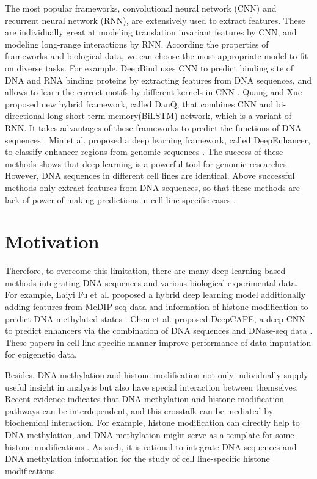The most popular frameworks, convolutional neural network (CNN) and recurrent neural network (RNN), are extensively used to extract features. These are individually great at modeling translation invariant features by CNN, and modeling long-range interactions by RNN. According the properties of frameworks and biological data, we can choose the most appropriate model to fit on diverse tasks. For example, DeepBind uses CNN to predict binding site of DNA and RNA binding proteins by extracting features from DNA sequences, and allows to learn the correct motifs by different kernels in CNN \cite{alipanahi2015predicting}. Quang and Xue proposed new hybrid framework, called DanQ, that combines CNN and bi-directional long-short term memory(BiLSTM) network, which is a variant of RNN. It takes advantages of these frameworks to predict the functions of DNA sequences \cite{quang2016danq}. Min et al. proposed a deep learning framework, called DeepEnhancer, to classify enhancer regions from genomic sequences \cite{min2016deepenhancer}. The success of these methods shows that deep learning is a powerful tool for genomic researches. However, DNA sequences in different cell lines are identical. Above successful methods only extract features from DNA sequences, so that these methods are lack of power of making predictions in cell line-specific cases \cite{yin2019deephistone}\cite{chen2021deepcape}.

\section{Motivation}
Therefore, to overcome this limitation, there are many deep-learning based methods integrating DNA sequences and various biological experimental data. For example, Laiyi Fu et al. proposed a hybrid deep learning model additionally adding features from MeDIP-seq data and information of histone modification to predict DNA methylated states \cite{fu2019predicting}. Chen et al. proposed DeepCAPE, a deep CNN to predict enhancers via the combination of DNA sequences and DNase-seq data \cite{chen2021deepcape}. These papers in cell line-specific manner improve performance of data imputation for epigenetic data.

Besides, DNA methylation and histone modification not only individually supply useful insight in analysis but also have special interaction between themselves. Recent evidence indicates that DNA methylation and histone modification pathways can be interdependent, and this crosstalk can be mediated by biochemical interaction. For example, histone modification can directly help to DNA methylation, and DNA methylation might serve as a template for some histone modifications \cite{cedar2009linking}. As such, it is rational to integrate DNA sequences and DNA methylation information for the study of cell line-specific histone modifications.

